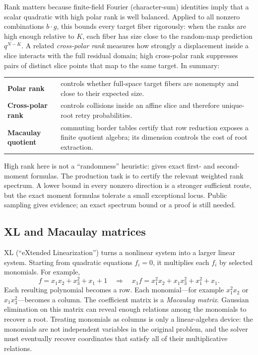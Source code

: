 \documentclass[11pt]{article}
\begin{document}
Rank matters because finite-field Fourier (character-sum) identities imply
that a scalar quadratic with high polar rank is well balanced.  Applied to all
nonzero combinations $b\cdot g$, this bounds every target fiber rigorously:
when the ranks are high enough relative to $K$, each fiber has size close to
the random-map prediction $q^{N-K}$.  A related \emph{cross-polar rank}
measures how strongly a displacement inside a slice interacts with the full
residual domain; high cross-polar rank suppresses pairs of distinct slice
points that map to the same target.  In summary:
\begin{center}
\begin{tabularx}{0.91\textwidth}{@{}>{\bfseries}p{}X@{}}
Polar rank & controls whether full-space target fibers are nonempty and close
to their expected size.\\
Cross-polar rank & controls collisions inside an affine slice and therefore
unique-root retry probabilities.\\
Macaulay quotient & commuting border tables certify that row reduction
exposes a finite quotient algebra; its dimension controls the cost of root
extraction.
\end{tabularx}
\end{center}
High rank here is not a ``randomness'' heuristic:  gives exact
first- and second-moment formulas.  The production task is to certify the
relevant weighted rank spectrum.  A lower bound in every nonzero direction is a
stronger sufficient route, but the exact moment formulas tolerate a small
exceptional locus.  Public sampling gives evidence; an exact spectrum bound or
a proof is still needed.

\subsection{XL and Macaulay matrices}\label{sec:xl-primer}

XL (``eXtended Linearization'') turns a nonlinear system into a larger linear
system.  Starting from quadratic equations $f_i=0$, it multiplies each $f_i$
by selected monomials.  For example,
\[
  f=x_1x_2+x_3^2+x_1+1
  \quad\Longrightarrow\quad
  x_1f=x_1^2x_2+x_1x_3^2+x_1^2+x_1.
\]
Each resulting polynomial becomes a row.  Each monomial---for example
$x_1^2x_2$ or $x_1x_3^2$---becomes a column.  The coefficient matrix is a
\emph{Macaulay matrix}.  Gaussian elimination on this matrix can reveal enough
relations among the monomials to recover a root.  Treating monomials as columns
is only a linear-algebra device: the monomials are not independent variables in
the original problem, and the solver must eventually recover coordinates that
satisfy all of their multiplicative relations.
\end{document}
